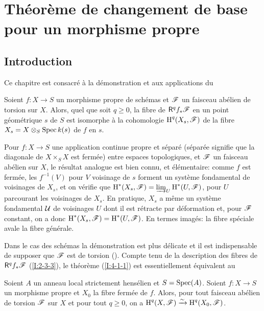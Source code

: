 \documentclass[oneside]{book}
\begin{document}
\section{Théorème de changement de base pour un morphisme propre}\label{I:4}










\subsection{Introduction}\label{I:4-1}

Ce chapitre est consacré à la démonstration et aux applications du 





\begin{theorem}\label{I:4-1-1}
Soient $f:X\to S$ un morphisme propre de schémas et $\mathscr{F}$ un faisceau abélien 
de torsion sur $X$. Alors, quel que soit $q\geqslant 0$, la fibre de 
$\mathsf{R}^q f_* \mathscr{F}$ en un point géométrique $s$ de $S$ est isomorphe à la 
cohomologie $\operatorname{H}^q(X_s,\mathscr{F})$ de la fibre $X_s=X\otimes_S \operatorname{Spec} k(s)$ de $f$ en 
$s$. 
\end{theorem}

Pour $f:X\to S$ une application continue propre et séparé (séparée 
signifie que la diagonale de $X\times_S X$ est fermée) entre espaces 
topologiques, et $\mathscr{F}$ un faisceau abélien sur $X$, le résultat analogue est 
bien connu, et élémentaire: comme $f$ est fermée, les $f^{-1}(V)$ pour 
$V$ voisinage de $s$ forment un système fondamental de voisinages de $X_s$, et 
on vérifie que $\operatorname{H}^*(X_s,\mathscr{F}) = \varinjlim_U \operatorname{H}^*(U,\mathscr{F})$, pour $U$ parcourant les 
voisinages de $X_s$. En pratique, $X_s$ a même un système fondamental 
$\mathcal{U}$ de voisinages $U$ dont il est rétracte par déformation et, pour $\mathscr{F}$ 
constant, on a donc $\operatorname{H}^*(X_s,\mathscr{F})=\operatorname{H}^*(U,\mathscr{F})$. En termes imagés: la fibre 
spéciale avale la fibre générale. 

Dans le cas des schémas la démonstration est plus délicate et il est 
indispensable de supposer que $\mathscr{F}$ est de torsion (\cite[XII.2]{4}). Compte 
tenu de la description des fibres de $\mathsf{R}^q f_* \mathscr{F}$ (\ref{I:2-3-3}), le théorème 
(\ref{I:4-1-1}) est essentiellement équivalent au 

 
  
   
    
\begin{theorem}\label{I:4-1-2}
Soient $A$ un anneau local strictement hensélien et $S=\operatorname{Spec}(A)$. Soient 
$f:X\to S$ un morphisme propre et $X_0$ la fibre fermée de $f$. Alors, pour 
tout faisceau abélien de torsion $\mathscr{F}$ sur $X$ et pour tout $q\geqslant 0$, on 
a $\operatorname{H}^q(X,\mathscr{F}) \xrightarrow\sim \operatorname{H}^q(X_0,\mathscr{F})$. 
\end{theorem} 
\end{document}
